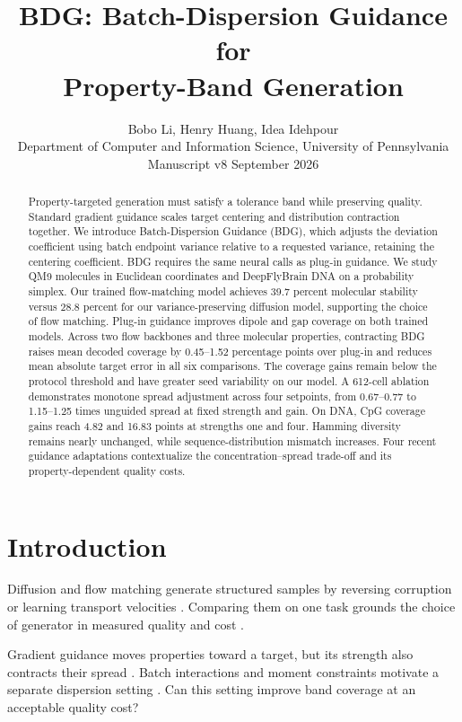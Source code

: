 \documentclass{article}
\title{BDG: Batch-Dispersion Guidance for\\Property-Band Generation}
\author{Bobo Li, Henry Huang, Idea Idehpour\\
Department of Computer and Information Science, University of Pennsylvania\\
\small Manuscript v8 \quad 29 September 2026}
\begin{document}
\maketitle
\begin{abstract}
Property-targeted generation must satisfy a tolerance band while preserving quality. Standard gradient guidance scales target centering and distribution contraction together. We introduce Batch-Dispersion Guidance (BDG), which adjusts the deviation coefficient using batch endpoint variance relative to a requested variance, retaining the centering coefficient. BDG requires the same neural calls as plug-in guidance. We study QM9 molecules in Euclidean coordinates and DeepFlyBrain DNA on a probability simplex. Our trained flow-matching model achieves 39.7 percent molecular stability versus 28.8 percent for our variance-preserving diffusion model, supporting the choice of flow matching. Plug-in guidance improves dipole and gap coverage on both trained models. Across two flow backbones and three molecular properties, contracting BDG raises mean decoded coverage by 0.45--1.52 percentage points over plug-in and reduces mean absolute target error in all six comparisons. The coverage gains remain below the protocol threshold and have greater seed variability on our model. A 612-cell ablation demonstrates monotone spread adjustment across four setpoints, from 0.67--0.77 to 1.15--1.25 times unguided spread at fixed strength and gain. On DNA, CpG coverage gains reach 4.82 and 16.83 points at strengths one and four. Hamming diversity remains nearly unchanged, while sequence-distribution mismatch increases. Four recent guidance adaptations contextualize the concentration--spread trade-off and its property-dependent quality costs.
\end{abstract}

\section{Introduction}
Diffusion and flow matching generate structured samples by reversing corruption or learning transport velocities \citep{karras2022elucidating,lipman2022flow}. Comparing them on one task grounds the choice of generator in measured quality and cost \citep{albergo2025stochastic}.

Gradient guidance moves properties toward a target, but its strength also contracts their spread \citep{chung2023dps,song2023lgd}. Batch interactions and moment constraints motivate a separate dispersion setting \citep{corso2024particle,mgd2026moment}. Can this setting improve band coverage at an acceptable quality cost?
\end{document}
